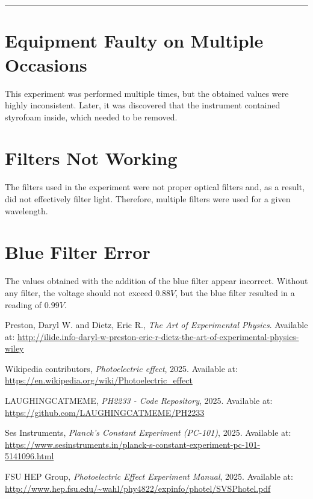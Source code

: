 \documentclass[%
 sor,
 jor,
 amsmath,amssymb,
 reprint,%
]{revtex4-2}
\begin{document}
\noindent{}\\
\\

\noindent\rule{\linewidth}{0.4pt}
\vspace{6.6cm}
\pagebreak

\appendix
\section{Equipment Faulty on Multiple Occasions} \label{appendix:prevexp}
This experiment was performed multiple times, but the obtained values were highly inconsistent. Later, it was discovered that the instrument contained styrofoam inside, which needed to be removed.  
\section{Filters Not Working} \label{appendix:filters}
The filters used in the experiment were not proper optical filters and, as a result, did not effectively filter light. Therefore, multiple filters were used for a given wavelength.  

\section{Blue Filter Error} \label{appendix:bluefilter}
The values obtained with the addition of the blue filter appear incorrect. Without any filter, the voltage should not exceed $0.88V$, but the blue filter resulted in a reading of $0.99V$.  



\begin{thebibliography}{9}

 Preston, Daryl W. and Dietz, Eric R., \emph{The Art of Experimental Physics}. Available at: \url{http://ilide.info-daryl-w-preston-eric-r-dietz-the-art-of-experimental-physics-wiley}

Wikipedia contributors, \emph{Photoelectric effect}, 2025. Available at: \url{https://en.wikipedia.org/wiki/Photoelectric_effect}

LAUGHINGCATMEME, \emph{PH2233 - Code Repository}, 2025. Available at: \url{https://github.com/LAUGHINGCATMEME/PH2233}

Ses Instruments, \emph{Planck's Constant Experiment (PC-101)}, 2025. Available at: \url{https://www.sesinstruments.in/planck-s-constant-experiment-pc-101-5141096.html}

FSU HEP Group, \emph{Photoelectric Effect Experiment Manual}, 2025. Available at: \url{http://www.hep.fsu.edu/~wahl/phy4822/expinfo/photel/SVSPhotel.pdf}

\end{thebibliography}
\end{document}
